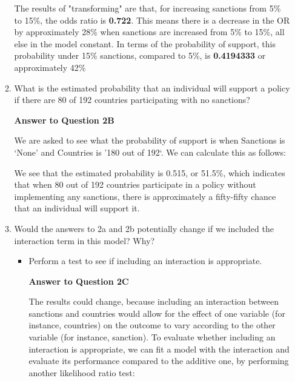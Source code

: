 \documentclass[12pt,letterpaper]{article}
\begin{document}
\begin{enumerate}
\begin{enumerate}
		\vspace{.25cm} 	
		
		\vspace{.25cm} 	
		
		The results of "transforming" are that, for increasing sanctions from 5\% to 15\%, the odds ratio is \textbf{0.722}. This means there is a decrease in the OR by approximately 28\% when sanctions are increased from 5\% to 15\%, all else in the model constant. In terms of the probability of support, this probability under 15\% sanctions, compared to 5\%, is \textbf{0.4194333} or approximately 42\%
		
		\newpage
		\item
		What is the estimated probability that an individual will support a policy if there are 80 of 192 countries participating with no sanctions? 
		
		\vspace{.25cm} 	
		\textbf{Answer to Question 2B}
		\vspace{.25cm} 	
		
		We are asked to see what the probability of support is when Sanctions is `None' and Countries is '180 out of 192`. We can calculate this as follows: 
		
		\vspace{.25cm} 	
		
		\vspace{.25cm} 	
		
		\noindent We see that the estimated probability is 0.515, or 51.5\%, which indicates that when 80 out of 192 countries participate in a policy without implementing any sanctions, there is approximately a fifty-fifty chance that an individual will support it. 
		
		\newpage
		\item
		Would the answers to 2a and 2b potentially change if we included the interaction term in this model? Why? 
		\begin{itemize}
			\item Perform a test to see if including an interaction is appropriate.
			
		\vspace{.25cm} 		
		\textbf{Answer to Question 2C}
		\vspace{.25cm} 	
		
		\noindent The results could change, because including an interaction between sanctions and countries would allow for the effect of one variable (for instance, countries) on the outcome to vary according to the other variable (for instance, sanction). To evaluate whether including an interaction is appropriate, we can fit a model with the interaction and evaluate its performance compared to the additive one, by performing another likelihood ratio test: 
		

\end{itemize}
\end{enumerate}
\end{enumerate}
\end{document}
